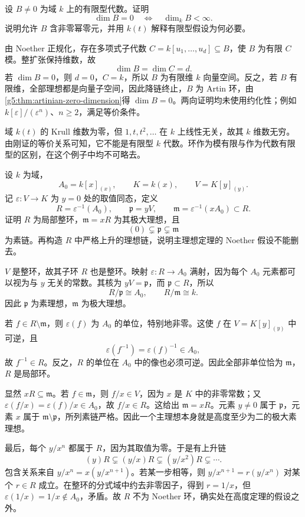 \begin{exercise}\label{g5:ex:zero-dimensional-finite-type}
	设 \(B\ne0\) 为域 \(k\) 上的有限型代数。证明
	\[
		\dim B=0\quad\Longleftrightarrow\quad\dim_k B<\infty.
	\]
	说明允许 \(B\) 含非零幂零元，并用 \(k(t)\) 解释有限型假设为何必要。
\end{exercise}
\begin{solution}
	由 Noether 正规化，存在多项式子代数 \(C=k[u_1,\ldots,u_d]\subseteq B\)，使 \(B\) 为有限 \(C\) 模。整扩张保持维数，故
	\[
		\dim B=\dim C=d.
	\]
	若 \(\dim B=0\)，则 \(d=0\)，\(C=k\)，所以 \(B\) 为有限维 \(k\) 向量空间。反之，若 \(B\) 有限维，全部理想都是向量子空间，因此降链终止，\(B\) 为 Artin 环，由\cref{g5:thm:artinian-zero-dimension}得 \(\dim B=0\)。两向证明均未使用约化性；例如 \(k[\varepsilon]/(\varepsilon^n)\)、\(n\geq2\)，满足等价条件。

	域 \(k(t)\) 的 Krull 维数为零，但 \(1,t,t^2,\ldots\) 在 \(k\) 上线性无关，故其 \(k\) 维数无穷。由刚证的等价关系可知，它不能是有限型 \(k\) 代数。环作为模有限与作为代数有限型的区别，在这个例子中均不可略去。
\end{solution}

\begin{exercise}\label{g5:ex:nonnoetherian-principal-height}
	设 \(k\) 为域，
	\[
		A_0=k[x]_{(x)},\qquad K=k(x),\qquad V=K[y]_{(y)}.
	\]
	记 \(\varepsilon:V\to K\) 为 \(y=0\) 处的取值同态，定义
	\[
		R=\varepsilon^{-1}(A_0),\qquad
		\mathfrak p=yV,\qquad
		\mathfrak m=\varepsilon^{-1}(xA_0)\subset R.
	\]
	证明 \(R\) 为局部整环，\(\mathfrak m=xR\) 为其极大理想，且
	\[
		(0)\subsetneq\mathfrak p\subsetneq\mathfrak m
	\]
	为素链。再构造 \(R\) 中严格上升的理想链，说明主理想定理的 Noether 假设不能删去。
\end{exercise}
\begin{solution}
	\(V\) 是整环，故其子环 \(R\) 也是整环。映射 \(\varepsilon:R\to A_0\) 满射，因为每个 \(A_0\) 元素都可以视为与 \(y\) 无关的常数。其核为 \(yV=\mathfrak p\)，而 \(\mathfrak p\subset R\)，所以
	\[
		R/\mathfrak p\cong A_0,\qquad R/\mathfrak m\cong k.
	\]
	因此 \(\mathfrak p\) 为素理想，\(\mathfrak m\) 为极大理想。

	若 \(f\in R\setminus\mathfrak m\)，则 \(\varepsilon(f)\) 为 \(A_0\) 的单位，特别地非零。这使 \(f\) 在 \(V=K[y]_{(y)}\) 中可逆，且
	\[
		\varepsilon(f^{-1})=\varepsilon(f)^{-1}\in A_0,
	\]
	故 \(f^{-1}\in R\)。反之，\(R\) 的单位在 \(A_0\) 中的像也必须可逆。因此全部非单位恰为 \(\mathfrak m\)，\(R\) 是局部环。

	显然 \(xR\subseteq\mathfrak m\)。若 \(f\in\mathfrak m\)，则 \(f/x\in V\)，因为 \(x\) 是 \(K\) 中的非零常数；又
	\(\varepsilon(f/x)=\varepsilon(f)/x\in A_0\)，故 \(f/x\in R\)。这给出 \(\mathfrak m=xR\)。元素 \(y\ne0\) 属于 \(\mathfrak p\)，元素 \(x\) 属于 \(\mathfrak m\setminus\mathfrak p\)，所列素链严格。因此一个主理想本身就是高度至少为二的极大素理想。

	最后，每个 \(y/x^n\) 都属于 \(R\)，因为其取值为零。于是有上升链
	\[
		(y)R\subsetneq(y/x)R\subsetneq(y/x^2)R\subsetneq\cdots.
	\]
	包含关系来自 \(y/x^n=x(y/x^{n+1})\)。若某一步相等，则 \(y/x^{n+1}=r(y/x^n)\) 对某个 \(r\in R\) 成立。在整环的分式域中约去非零因子，得到 \(r=1/x\)，但 \(\varepsilon(1/x)=1/x\notin A_0\)，矛盾。故 \(R\) 不为 Noether 环，确实处在高度定理的假设之外。
\end{solution}
